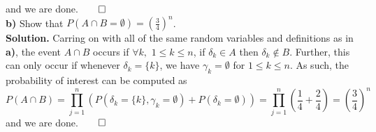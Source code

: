 \documentclass[11pt, letterpaper]{article}
\begin{document}
    and we are done.\hfill{$\qed$}\\[10pt]
    {\bf b)} Show that $P(A\cap B=\emptyset)=\left(\frac{3}{4}\right)^n$.\\[10pt]
    {\bf Solution.} Carring on with all of the same random variables and definitions as in {\bf a)}, the event $A\cap B$ occurs if $\forall k,$ $1\leq k\leq n$, if $\delta_k\in A$ then $\delta_k\notin B$. Further, this can only occur if whenever $\delta_k=\{k\}$, we have $\gamma_k=\emptyset$ for $1\leq k\leq n$.
    As such, the probability of interest can be computed as
    \[P(A\cap B)=\prod_{j=1}^n(P(\delta_k=\{k\}, \gamma_k=\emptyset)+P(\delta_k=\emptyset))=\prod_{j=1}^n\left(\frac{1}{4}+\frac{2}{4}\right)=\left(\frac{3}{4}\right)^n\]
    and we are done.\hfill{$\qed$}\\[10pt]
\end{document}
